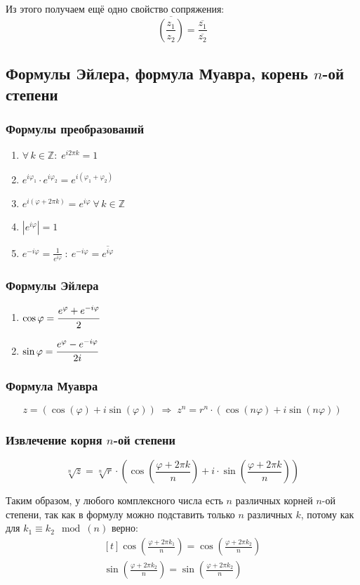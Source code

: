 \documentclass{article}
\newcommand{\Z}{\mathbb Z}
\begin{document}
Из этого получаем ещё одно свойство сопряжения:
$$ \overline{\left(\frac{z_1}{z_2}\right)}=\frac{\overline{z_1}}{\overline{z_2}} $$
\newpage
\subsection{Формулы Эйлера, формула Муавра, корень $n$-ой степени}
\subsubsection{Формулы преобразований}
\begin{enumerate}
    \item $\forall\,k\in\Z:\;e^{i2\pi k}=1$
    \item $e^{i\varphi_1}\cdot e^{i\varphi_2}=e^{i(\varphi_1+\varphi_2)}$
    \item $e^{i(\varphi+2\pi k)}=e^{i\varphi}\:\forall\,k\in\Z$
    \item $|e^{i\varphi}|=1$
    \item $e^{-i\varphi}=\frac{1}{e^{i\varphi}}\::\:e^{-i\varphi}=\overline{e^{i\varphi}}$
\end{enumerate}
\subsubsection{Формулы Эйлера}
    \begin{enumerate}
        \item $\cos\varphi=\cfrac{e^{\varphi}+e^{-i\varphi}}{2}$
        \item $\sin\varphi=\cfrac{e^{\varphi}-e^{-i\varphi}}{2i}$
    \end{enumerate}
\subsubsection{Формула Муавра}
    
    $$z = (\cos(\varphi) + i\sin(\varphi)) \; \Rightarrow \; z^n=r^n\cdot(\cos(n\varphi)+i\sin(n\varphi))$$
    
\subsubsection{Извлечение корня $n$-ой степени}
    
    $$\sqrt[n]{z}=\sqrt[n]{r}\cdot\left(\cos\left(\frac{\varphi+2\pi k}{n}\right)+i\cdot \sin\left(\frac{\varphi+2\pi k}{n}\right)\right)$$
    
    Таким образом, у любого комплексного числа есть $n$ различных корней $n$-ой степени, так как в формулу можно подставить только $n$ различных $k$, потому как для $k_1 \equiv k_2 \mod (n)$ верно:
    \begin{equation*}
    	\begin{aligned}[t]
    		\cos\left(\frac{\varphi+2\pi k_1}{n}\right) = \cos\left(\frac{\varphi+2\pi k_2}{n}\right) \\
    		\sin\left(\frac{\varphi+2\pi k_2}{n}\right) = \sin\left(\frac{\varphi+2\pi k_2}{n}\right)
    	\end{aligned}
    \end{equation*}
\end{document}
